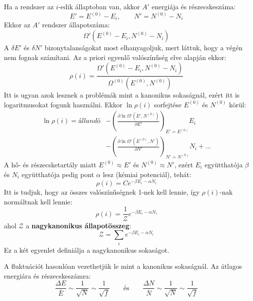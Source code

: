 \documentclass[../main.tex]{subfiles}
\begin{document}
Ha a rendszer az $i$-edik állaptoban van, akkor $A'$ energiája és részecskeszáma:
\begin{equation}
    E' = E^{(0)} - E_i, \qquad N' = N^{(0)} - N_i
\end{equation}
Ekkor az $A'$ rendszer állapotszáma:
\begin{equation}
    \Omega' (E^{(0)} - E_i, N^{(0)} - N_i)
\end{equation}
A $\delta E'$ és $\delta N'$ bizonytalanságokat most elhanyagoljuk, mert láttuk, hogy a végén nem fognak számítani. Az a priori egyenlő valószínűség elve alapján ekkor:
\begin{equation}
    \rho(i) = \frac{\Omega' (E^{(0)} - E_i, N^{(0)} - N_i)}{\Omega^{(0)} (E^{(0)}, N^{(0)})}
\end{equation}
Itt is ugyan azok lesznek a problémák mint a kanonikus sokaságnál, ezért itt is logaritmusokat fogunk használni. Ekkor $\ln \rho(i)$ sorfejtése $E^{(0)}$ és $N^{(0)}$ körül:
\begin{equation}
    \begin{aligned}
        \ln \rho(i) = állandó &- \left( \frac{\partial \ln \Omega'(E', N^{(0)})}{\partial E'} \right)_{E' = E^{(0)}} E_i \\
        & - \left( \frac{\partial \ln \Omega'(E^{(0)}, N')}{\partial N'} \right)_{N' = N^{(0)}} N_i + \ldots
    \end{aligned}
\end{equation}
A hő- és részecsketartály miatt $E^{(0)} \approx E'$ és $N^{(0)} \approx N'$, ezért $E_i$ együtthatója $\beta$ és $N_i$ együtthatója pedig pont $\alpha$ lesz (kémiai potenciál), tehát:
\begin{equation}
    \rho(i) = C e^{-\beta E_i - \alpha N_i}
\end{equation}
Itt is tudjuk, hogy az összes valószínűségnek 1-nek kell lennie, így $\rho(i)$-nak normáltnak kell lennie:
\begin{equation}
    \boxed{\rho(i) = \frac{1}{\mathcal{Z}} e^{-\beta E_i - \alpha N_i}}
\end{equation}
ahol $\mathcal{Z}$ a \textbf{nagykanonikus állapotösszeg}:
\begin{equation}
    \mathcal{Z} = \sum_{i} e^{-\beta E_i - \alpha N_i}
\end{equation}
Ez a két egyenlet definiálja a nagykanonikus sokaságot.

A fluktuációt hasonlóan vezethetjük le mint a kanonikus sokaságnál. Az átlagos energiára és részecskeszámra:
\begin{equation}
    \frac{\Delta E}{\bar{E}} \sim \frac{1}{\sqrt{N}} \sim \frac{1}{\sqrt{f}} \qquad \text{és} \qquad \frac{\Delta N}{\bar{N}} \sim \frac{1}{\sqrt{N}} \sim \frac{1}{\sqrt{f}}
\end{equation}
\end{document}
